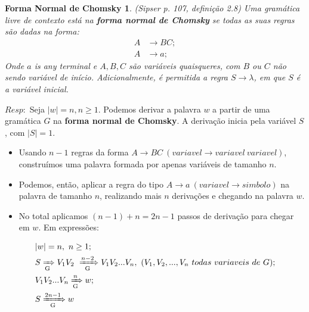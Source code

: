 \documentclass{homework}
\newtheorem*{theorem}{Forma Normal de Chomsky}
\begin{document}
	\begin{theorem}
		(Sipser p. 107, definição 2.8) Uma gramática livre de contexto está na \textbf{forma normal de Chomsky} se todas as suas regras são dadas na forma:
		\begin{align*}
			A & \rightarrow BC; \\
			A & \rightarrow a;
		\end{align*}
		Onde $a$ is any terminal e $A,B,C$ são variáveis quaisqueres, com $B$ ou $C$ não sendo variável de início. Adicionalmente, é permitida a regra $S \rightarrow \lambda$, em que $S$ é a variável inicial.  
	\end{theorem}
	$Resp:$ Seja $|w| = n, n \geq 1$. Podemos derivar a palavra $w$ a partir de uma gramática $G$ na \textbf{forma normal de Chomsky}. A derivação inicia pela variável $S$, com $|S| = 1$.
		\begin{itemize}
			\item Usando $n-1$ regras da forma $A \rightarrow BC\ (variavel \rightarrow variavel\ variavel)$, construímos uma palavra formada por apenas variáveis de tamanho $n$.
			\item Podemos, então, aplicar a regra do tipo $A \rightarrow a\ (variavel \rightarrow simbolo)$ na palavra de tamanho $n$, realizando mais $n$ derivações e chegando na palavra $w$.
			\item  No total aplicamos $(n - 1) + n = 2n -1$ passos de derivação para chegar em $w$. Em expressões:
		\end{itemize}

		\begin{align}
			& |w| = n,\ n \geq 1; \\			
			& S \xRightarrow[\text{G}]{} V_1V_2\ \xRightarrow[\text{G}]{n-2} V_1V_2...V_n,\  (V_1,V_2,...,V_n\ todas\ variaveis\ de\ G); \\
			& V_1V_2...V_n \xRightarrow[\text{G}]{n} w;\\
			& S \xRightarrow[\text{G}]{2n - 1} w
		\end{align}
		
\newpage
\end{document}

